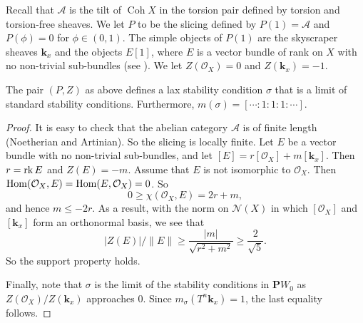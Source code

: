 \documentclass{amsart}
\begin{document}
Recall that \(\mathcal{A}\) is the tilt of \(\operatorname{Coh} X\) in the torsion pair defined by torsion and torsion-free sheaves.
We let \(P\) to be the slicing defined by \(P(1) = \mathcal{A}\) and \(P(\phi) = 0\) for \(\phi \in (0,1)\).
The simple objects of \(P(1)\) are the skyscraper sheaves \(\mathbf{k}_x\) and the objects \(E[1]\), where \(E\) is a vector bundle of rank on \(X\) with no non-trivial sub-bundles (see \cite[Remark~4.3 (iii)]{huy.mac.ste:08}).
We let \(Z(\mathcal{O}_X) = 0\) and \(Z(\mathbf{k}_x) = -1\).
\begin{proposition}\label{prop:red}
  The pair \((P,Z)\) as above defines a lax stability condition \(\sigma\) that is a limit of standard stability conditions.
  Furthermore, \(m(\sigma) = [\cdots : 1 : 1: 1 : \cdots]\).
\end{proposition}
\begin{proof}
  It is easy to check that the abelian category \(\mathcal{A}\) is of finite length (Noetherian and Artinian).
  So the slicing is locally finite.
  Let \(E\) be a vector bundle with no non-trivial sub-bundles, and let \([E] = r[\mathcal{O}_X] + m[\mathbf{k}_x]\).
  Then \(r = \operatorname{rk} E\) and \(Z(E) = -m\).
  Assume that \(E\) is not isomorphic to \(\mathcal{O}_X\).
  Then \(\operatorname{Hom}(\mathcal{O}_X, E) = \operatorname{Hom}(E, \mathcal{O}_X) = 0\).
  So \[0 \geq \chi(\mathcal{O}_X, E) = 2r+m,\]
  and hence \(m \leq -2r\).
  As a result, with the norm on \(\mathcal{N}(X)\) in which \([\mathcal{O}_X]\) and \([\mathbf{k}_x]\) form an orthonormal basis, we see that \[|Z(E)|/\|E\| \geq \frac{|m|}{\sqrt{r^2+m^2}} \geq \frac{2}{\sqrt 5}.\]
  So the support property holds.

  Finally, note that \(\sigma\) is the limit of the stability conditions in \(\mathbf{P}W_0\) as \(Z(\mathcal{O}_{X})/Z(\mathbf{k}_x)\) approaches \(0\).
  Since \(m_{\sigma}(T^n \mathbf{k}_x) = 1\), the last equality follows.
\end{proof}
\end{document}
